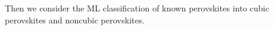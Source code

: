 \begin{comment}
\begin{figure}[!tbp]
  \texttt{[image: ../predicting-perovskites/reports/figures/falseNegatives-cubic:False]}
  \vspace*{-130mm}
  \caption{Dette kan vendes på 90 grader?}
  \label{fig:h1-fn}
\end{figure}

\begin{figure}[!tbp]
  \texttt{[image: ../predicting-perovskites/reports/figures/falsePositives-cubic:False]}
  \vspace*{-130mm}
  \caption{Dette kan vendes på 90 grader?}
  \label{fig:h1-fp}
\end{figure}

\end{comment}
\clearpage

Then we consider the ML classification of known perovskites into cubic perovskites and noncubic perovskites.

\begin{comment}
\begin{figure}[!tbp]
  \begin{subfigure}[b]{0.5\textwidth}
    \texttt{[image: ../predicting-perovskites/reports/figures/grid-scores/GB\\space-cubic:True.pdf]}
    \caption{Flower one.}
    \label{fig:h2-GB}
  \end{subfigure}%
  \hfill
  \begin{subfigure}[b]{0.5\textwidth}
    \texttt{[image: ../predicting-perovskites/reports/figures/grid-scores/RF\\space-cubic:True.pdf]}
    \caption{Flower two.}
    \label{fig:h2-RF}
  \end{subfigure}

  \begin{subfigure}[b]{0.5\textwidth}
    \texttt{[image: ../predicting-perovskites/reports/figures/grid-scores/DT\\space-cubic:True.pdf]}
    \caption{Flower one.}
    \label{fig:h2-DT}
  \end{subfigure}%
  \hfill
  \begin{subfigure}[b]{0.5\textwidth}
    \texttt{[image: ../predicting-perovskites/reports/figures/grid-scores/LOG\\space-cubic:True.pdf]}
    \caption{Flower two.}
    \label{fig:h2-LOG}
  \end{subfigure}
  \vspace*{-130mm}
  \caption{Four figures displaying hyperparameter search for predicting cubic perovskites or noncubic perovskites. The best estimator is visualized for all hyperparameters as a function of (a, b and c) max depth or (d) regularization strength during a grid search with a 5x5 stratified cross validation. The dotted lines marks the optimal hyperparameter-combination, while the error bars display the standard deviation. }
\end{figure}
\end{comment}
\clearpage

